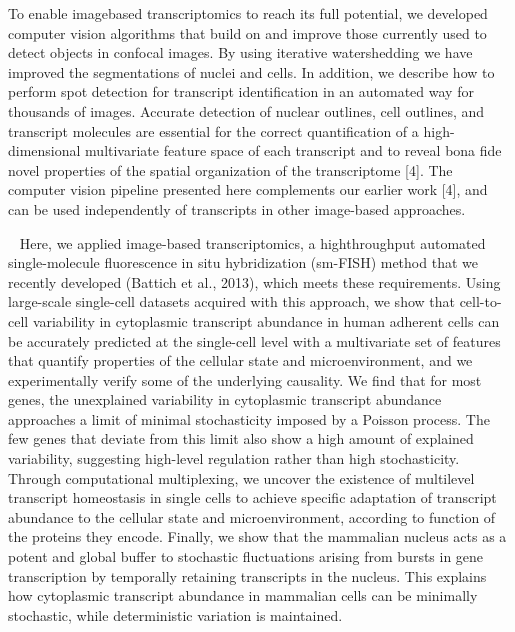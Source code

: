 To enable imagebased transcriptomics to reach its full potential, we developed
computer vision algorithms that build on and improve those currently used to
detect objects in confocal images. By using iterative watershedding we have
improved the segmentations of nuclei and cells. In addition, we describe how
to perform spot detection for transcript identification in an automated way for
thousands of images. Accurate detection of nuclear outlines, cell outlines, and
transcript molecules are essential for the correct quantification of a
high-dimensional multivariate feature space of each transcript and to reveal
bona fide novel properties of the spatial organization of the transcriptome [4].
The computer vision pipeline presented here complements our earlier work [4],
and can be used independently of transcripts in other image-based approaches.

~\cite{battich_control_2015}
Here, we applied image-based transcriptomics, a highthroughput automated
single-molecule fluorescence in situ hybridization (sm-FISH) method that we
recently developed (Battich et al., 2013), which meets these requirements.
Using large-scale single-cell datasets acquired with this approach, we show
that cell-to-cell variability in cytoplasmic transcript abundance in human
adherent cells can be accurately predicted at the single-cell level with a
multivariate set of features that quantify properties of the cellular state
and microenvironment, and we experimentally verify some of the underlying
causality. We find that for most genes, the unexplained variability in cytoplasmic
transcript abundance approaches a limit of minimal stochasticity imposed by a
Poisson process. The few genes that deviate from this limit also show a high
amount of explained variability, suggesting high-level regulation rather than
high stochasticity. Through computational multiplexing, we uncover the existence
of multilevel transcript homeostasis in single cells to achieve specific
adaptation of transcript abundance to the cellular state and microenvironment,
according to function of the proteins they encode. Finally, we show that the
mammalian nucleus acts as a potent and global buffer to stochastic fluctuations
arising from bursts in gene transcription by temporally retaining transcripts
in the nucleus. This explains how cytoplasmic transcript abundance in mammalian
cells can be minimally stochastic, while deterministic variation is maintained.

~\cite{khater_caveolae_2019}

